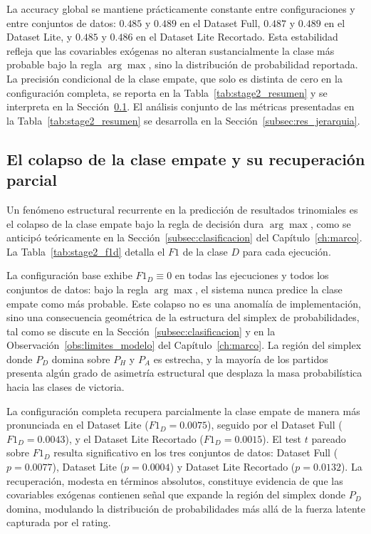 La accuracy global se mantiene pr\'acticamente constante entre configuraciones y entre conjuntos de datos: $0{.}485$ y $0{.}489$ en el Dataset Full, $0{.}487$ y $0{.}489$ en el Dataset Lite, y $0{.}485$ y $0{.}486$ en el Dataset Lite Recortado. Esta estabilidad refleja que las covariables ex\'ogenas no alteran sustancialmente la clase m\'as probable bajo la regla $\arg\max$, sino la distribuci\'on de probabilidad reportada. La precisi\'on condicional de la clase empate, que solo es distinta de cero en la configuraci\'on completa, se reporta en la Tabla~\ref{tab:stage2_resumen} y se interpreta en la Secci\'on~\ref{subsec:res_colapso_empate}. El an\'alisis conjunto de las m\'etricas presentadas en la Tabla~\ref{tab:stage2_resumen} se desarrolla en la Secci\'on~\ref{subsec:res_jerarquia}.

\subsection{El colapso de la clase empate y su recuperaci\'on parcial}
\label{subsec:res_colapso_empate}

Un fen\'omeno estructural recurrente en la predicci\'on de resultados trinomiales es el colapso de la clase empate bajo la regla de decisi\'on dura $\arg\max$, como se anticip\'o te\'oricamente en la Secci\'on~\ref{subsec:clasificacion} del Cap\'itulo~\ref{ch:marco}. La Tabla~\ref{tab:stage2_f1d} detalla el $F1$ de la clase $D$ para cada ejecuci\'on.



La configuraci\'on base exhibe $F1_D \equiv 0$ en todas las ejecuciones y todos los conjuntos de datos: bajo la regla $\arg\max$, el sistema nunca predice la clase empate como m\'as probable. Este colapso no es una anomal\'ia de implementaci\'on, sino una consecuencia geom\'etrica de la estructura del simplex de probabilidades, tal como se discute en la Secci\'on~\ref{subsec:clasificacion} y en la Observaci\'on~\ref{obs:limites_modelo} del Cap\'itulo~\ref{ch:marco}. La regi\'on del simplex donde $P_D$ domina sobre $P_H$ y $P_A$ es estrecha, y la mayor\'ia de los partidos presenta alg\'un grado de asimetr\'ia estructural que desplaza la masa probabil\'istica hacia las clases de victoria.

La configuraci\'on completa recupera parcialmente la clase empate de manera m\'as pronunciada en el Dataset Lite ($F1_D = 0{.}0075$), seguido por el Dataset Full ($F1_D = 0{.}0043$), y el Dataset Lite Recortado ($F1_D = 0{.}0015$). El test $t$ pareado sobre $F1_D$ resulta significativo en los tres conjuntos de datos: Dataset Full ($p = 0{.}0077$), Dataset Lite ($p = 0{.}0004$) y Dataset Lite Recortado ($p = 0{.}0132$). La recuperaci\'on, modesta en t\'erminos absolutos, constituye evidencia de que las covariables ex\'ogenas contienen se\~nal que expande la regi\'on del simplex donde $P_D$ domina, modulando la distribuci\'on de probabilidades m\'as all\'a de la fuerza latente capturada por el rating.

